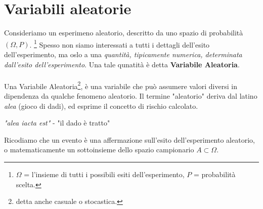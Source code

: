 \chapter{Variabili aleatorie}
Consideriamo un esperimeno aleatorio, descritto da uno spazio di probabilità $(\Omega, P)$.
\footnote{$\Omega$ = l'insieme di tutti i possibili esiti dell'esperimento, $P$ = probabilità scelta.}
Spesso non siamo interessati a tutti i dettagli dell'esito dell'esperimento, ma oslo a una \emph{quantità, tipicamente numerica, determinata dall'esito dell'esperimento}.
Una tale qunatità è detta \textbf{Variabile Aleatoria}.
\\\\Una Variabile Aleatoria\footnote{detta anche casuale o stocastica.}, è una variabile che può assumere valori diversi in dipendenza da qualche fenomeno aleatorio.
 Il termine "aleatorio" deriva dal latino \textit{alea} (gioco di dadi), ed esprime il
concetto di rischio calcolato.
\begin{center}
    \textit{"alea iacta est"} - "il dado è tratto"
\end{center}

Ricodiamo che un evento è una affermazione sull'esito dell'esperimento aleatorio, o matematicamente un 
sottoinsieme dello spazio campionario $A \subset \Omega$.

